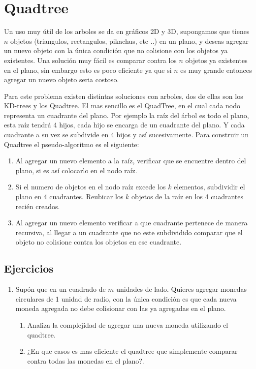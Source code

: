 \section{Quadtree}

Un uso muy útil de los arboles se da en gráficos 2D y 3D, supongamos que tienes $n$ objetos (triangulos, rectangulos, pikachus, etc ..) en un plano, y deseas agregar un nuevo objeto con la única condición que no colisione con los objetos ya existentes. Una solución muy fácil es comparar contra los $n$ objetos ya existentes en el plano, sin embargo esto es poco eficiente  ya que si $n$ es muy grande entonces agregar un nuevo objeto seria costoso. 

Para este problema existen distintas soluciones con arboles, dos de ellas son los KD-trees y los Quadtree. El mas sencillo es el QuadTree, en el cual cada nodo representa un cuadrante del plano. Por ejemplo la raíz del árbol es todo el plano, esta raíz tendrá 4 hijos, cada hijo se encarga de un cuadrante del plano. Y cada cuadrante a su vez se subdivide en 4 hijos y así sucesivamente. Para construir un Quadtree el pseudo-algoritmo es el siguiente: 

\begin{enumerate}
    \item Al agregar un nuevo elemento a la raíz, verificar que se encuentre dentro del plano, si es así colocarlo en el nodo raíz. 
    \item Si el numero de objetos en el nodo raíz excede los $k$ elementos, subdividir el plano en 4 cuadrantes. Reubicar los $k$ objetos de la raíz en los 4 cuadrantes recién creados.
    \item Al agregar un nuevo elemento verificar a que cuadrante pertenece de manera recursiva, al llegar a un cuadrante que no este subdividido comparar que el objeto no colisione contra los objetos en ese cuadrante.
\end{enumerate}

\subsection{Ejercicios}
\begin{enumerate}
    \item Supón que en un cuadrado de $m$ unidades de lado. Quieres agregar monedas circulares de 1 unidad de radio, con la única condición es que cada nueva moneda agregada no debe colisionar con las ya agregadas en el plano. 
    \begin{enumerate}
    \item Analiza la complejidad de agregar una nueva moneda utilizando el quadtree.
    \item ¿En que casos es mas eficiente el quadtree que simplemente comparar contra todas las monedas en el plano?.
    \end{enumerate}
\end{enumerate}






